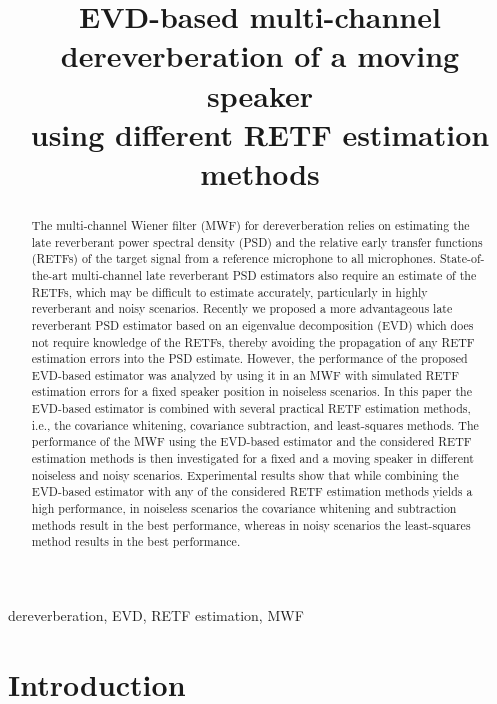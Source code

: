 \documentclass{article}
\title{EVD-based multi-channel dereverberation of a moving speaker \\ using different RETF estimation methods}
\def\ninept{\def\baselinestretch{.9}\let\normalsize\small\normalsize}
\begin{document}
\newlength\figureheight
\newlength\figurewidth

\setlength\figureheight{2.5cm}
\setlength{}

\ninept
%
\maketitle
%
\begin{abstract}
  The multi-channel Wiener filter (MWF) for dereverberation relies on estimating the late reverberant power spectral density (PSD) and the relative early transfer functions (RETFs) of the target signal from a reference microphone to all microphones.
  State-of-the-art  multi-channel late reverberant PSD estimators also require an estimate of the RETFs, which may be difficult to estimate accurately, particularly in highly reverberant and noisy scenarios.
  Recently we proposed a more advantageous late reverberant PSD estimator based on an eigenvalue decomposition (EVD) which does not require knowledge of the RETFs, thereby avoiding the propagation of any RETF estimation errors into the PSD estimate.
  However, the performance of the proposed EVD-based estimator was analyzed by using it in an MWF with simulated RETF estimation errors for a fixed speaker position in noiseless scenarios. 
  In this paper the EVD-based estimator is combined with several practical RETF estimation methods, i.e., the covariance whitening, covariance subtraction, and least-squares methods.
  The performance of the MWF using the EVD-based estimator and the considered RETF estimation methods is then investigated for a fixed and a moving speaker in different noiseless and noisy scenarios.
  Experimental results show that while combining the EVD-based estimator with any of the considered RETF estimation methods yields a high performance, in noiseless scenarios the covariance whitening and subtraction methods result in the best performance, whereas in noisy scenarios the least-squares method results in the best performance.
\end{abstract}
%
\begin{keywords}
dereverberation, EVD, RETF estimation, MWF
\end{keywords}
%
\section{Introduction}
\label{sec: intro}
\end{document}
